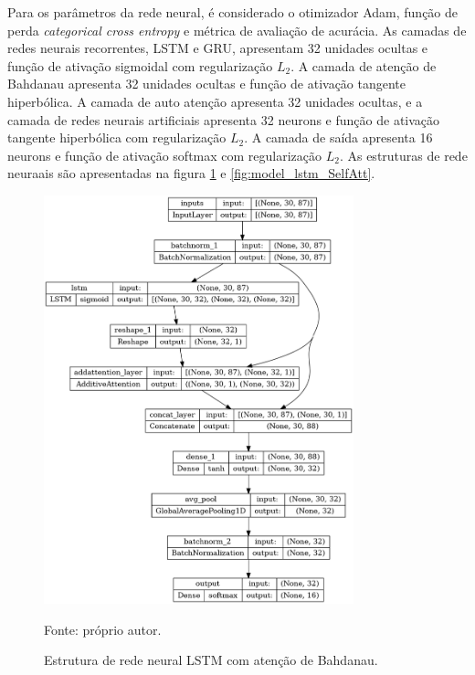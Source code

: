         \ipar Para os parâmetros da rede neural, é considerado o otimizador Adam, função de perda \textit{categorical cross entropy} e métrica de avaliação de acurácia. As camadas de redes neurais recorrentes, LSTM e GRU, apresentam 32 unidades ocultas e função de ativação sigmoidal com regularização $L_{2}$. A camada de atenção de Bahdanau apresenta 32 unidades ocultas e função de ativação tangente hiperbólica. A camada de auto atenção apresenta 32 unidades ocultas, e a camada de redes neurais artificiais apresenta 32 neurons e função de ativação tangente hiperbólica com regularização $L_{2}$. A camada de saída apresenta 16 neurons e função de ativação softmax com regularização $L_{2}$. As estruturas de rede neuraais são apresentadas na figura \ref{fig:model_lstm_BauhAtt} e \ref{fig:model_lstm_SelfAtt}.


        \begin{figure}[htpb]
            \centering
            \caption{Estrutura de rede neural LSTM com atenção de Bahdanau.}
            \label{fig:model_lstm_BauhAtt}
            \includegraphics[width=0.8\textwidth]{./imagens/model_lstm_BauhAtt.png}
            \par \footnotesize Fonte: próprio autor.
        \end{figure}


